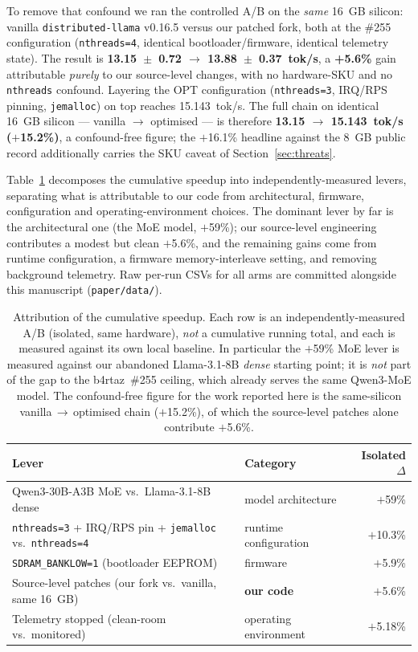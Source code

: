\documentclass[10pt,a4paper]{article}
\begin{document}
To remove that confound we ran the controlled A/B on the \emph{same} 16~GB silicon: vanilla \texttt{distributed-llama} v0.16.5 versus our patched fork, both at the \#255 configuration (\texttt{nthreads=4}, identical bootloader/firmware, identical telemetry state). The result is \textbf{13.15~$\pm$~0.72 $\to$ 13.88~$\pm$~0.37~tok/s}, a \textbf{+5.6\%} gain attributable \emph{purely} to our source-level changes, with no hardware-SKU and no \texttt{nthreads} confound. Layering the OPT configuration (\texttt{nthreads=3}, IRQ/RPS pinning, \texttt{jemalloc}) on top reaches 15.143~tok/s. The full chain on identical 16~GB silicon --- vanilla $\to$ optimised --- is therefore \textbf{13.15 $\to$ 15.143~tok/s ($+$15.2\%)}, a confound-free figure; the $+$16.1\% headline against the 8~GB public record additionally carries the SKU caveat of Section~\ref{sec:threats}.

Table~\ref{tab:attribution} decomposes the cumulative speedup into independently-measured levers, separating what is attributable to our code from architectural, firmware, configuration and operating-environment choices. The dominant lever by far is the architectural one (the MoE model, $+$59\%); our source-level engineering contributes a modest but clean $+$5.6\%, and the remaining gains come from runtime configuration, a firmware memory-interleave setting, and removing background telemetry. Raw per-run CSVs for all arms are committed alongside this manuscript (\texttt{paper/data/}).

\begin{table}[h]
\centering
\small
\caption{Attribution of the cumulative speedup. Each row is an independently-measured A/B (isolated, same hardware), \emph{not} a cumulative running total, and each is measured against its own local baseline. In particular the $+$59\% MoE lever is measured against our abandoned Llama-3.1-8B \emph{dense} starting point; it is \emph{not} part of the gap to the b4rtaz~\#255 ceiling, which already serves the same Qwen3-MoE model. The confound-free figure for the work reported here is the same-silicon vanilla\,$\to$\,optimised chain ($+$15.2\%), of which the source-level patches alone contribute $+$5.6\%.}
\label{tab:attribution}
\begin{tabular}{@{}llr@{}}
\toprule
\textbf{Lever} & \textbf{Category} & \textbf{Isolated $\Delta$} \\
\midrule
Qwen3-30B-A3B MoE vs.\ Llama-3.1-8B dense & model architecture & $+$59\% \\
\texttt{nthreads=3} + IRQ/RPS pin + \texttt{jemalloc} vs.\ \texttt{nthreads=4} & runtime configuration & $+$10.3\% \\
\texttt{SDRAM\_BANKLOW=1} (bootloader EEPROM) & firmware & $+$5.9\% \\
Source-level patches (our fork vs.\ vanilla, same 16~GB) & \textbf{our code} & $+$5.6\% \\
Telemetry stopped (clean-room vs.\ monitored) & operating environment & $+$5.18\% \\
\bottomrule
\end{tabular}
\end{table}
\end{document}
